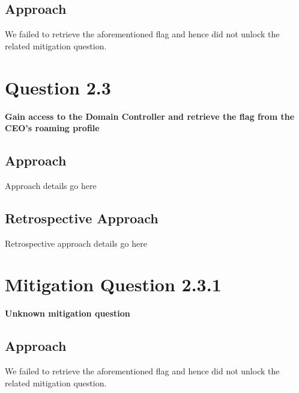 \subsection{Approach}
We failed to retrieve the aforementioned flag and hence did not unlock the
related mitigation question.

\section{Question 2.3}
\textbf{Gain access to the Domain Controller and retrieve the flag from the
CEO's roaming profile}
\subsection{Approach}
Approach details go here
\subsection{Retrospective Approach}
Retrospective approach details go here

\section{Mitigation Question 2.3.1}
\textbf{Unknown mitigation question}
\subsection{Approach}
We failed to retrieve the aforementioned flag and hence did not unlock the
related mitigation question.
